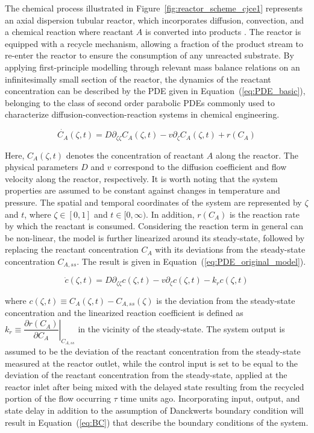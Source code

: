 The chemical process illustrated in Figure~\ref{fig:reactor_scheme_cjce1} represents an axial dispersion tubular reactor, which incorporates diffusion, convection, and a chemical reaction where reactant $A$ is converted into products \autocite{levenspiel1998chemical}. The reactor is equipped with a recycle mechanism, allowing a fraction of the product stream to re-enter the reactor to ensure the consumption of any unreacted substrate. By applying first-principle modelling through relevant mass balance relations on an infinitesimally small section of the reactor, the dynamics of the reactant concentration can be described by the PDE given in Equation~(\ref{eq:PDE_basic}), belonging to the class of second order parabolic PDEs commonly used to characterize diffusion-convection-reaction systems \autocite{jensen1982bifurcation} in chemical engineering.

\begin{equation} \label{eq:PDE_basic}
    \dot{C_A}(\zeta, t) = D \partial_{\zeta \zeta} C_A(\zeta, t) - v \partial_\zeta C_A(\zeta, t) + r(C_A)
\end{equation}

Here, $C_A(\zeta, t)$ denotes the concentration of reactant $A$ along the reactor. The physical parameters $D$ and $v$ correspond to the diffusion coefficient and flow velocity along the reactor, respectively. It is worth noting that the system properties are assumed to be constant against changes in temperature and pressure. The spatial and temporal coordinates of the system are represented by $\zeta$ and $t$, where $\zeta \in [0, 1]$ and $t \in [0, \infty)$. In addition, $r(C_A)$ is the reaction rate by which the reactant is consumed. Considering the reaction term in general can be non-linear, the model is further linearized around its steady-state, followed by replacing the reactant concentration $C_A$ with its deviations from the steady-state concentration $C_{A,ss}$. The result is given in Equation~(\ref{eq:PDE_original_model}).

\begin{equation} \label{eq:PDE_original_model}
    \dot{c}(\zeta, t) = D \partial_{\zeta \zeta} c(\zeta, t) - v \partial_\zeta c(\zeta, t) - k_r c(\zeta, t)
\end{equation}

where $c(\zeta, t) \equiv C_A(\zeta, t) - C_{A, ss}(\zeta)$ is the deviation from the steady-state concentration and the linearized reaction coefficient is defined as $k_r \equiv \left. \dfrac{\partial r(C_A)}{\partial C_A} \right|_{C_{A, ss}}$ in the vicinity of the steady-state. The system output is assumed to be the deviation of the reactant concentration from the steady-state measured at the reactor outlet, while the control input is set to be equal to the deviation of the reactant concentration from the steady-state, applied at the reactor inlet after being mixed with the delayed state resulting from the recycled portion of the flow occurring $\tau$ time units ago. Incorporating input, output, and state delay in addition to the assumption of Danckwerts boundary condition will result in Equation~(\ref{eq:BC}) that describe the boundary conditions of the system.

